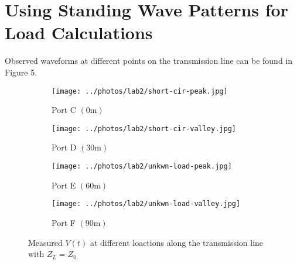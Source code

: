 \documentclass[10pt]{article}
\begin{document}

\section{Using Standing Wave Patterns for Load Calculations}

Observed waveforms at different points on the transmission line can be found in Figure 5.

\begin{figure}[ht]
    \centering
    \begin{subfigure}[b]{0.45\textwidth}
        \texttt{[image: ../photos/lab2/short-cir-peak.jpg]}
        \caption{Port C $(0\text{m})$}
    \end{subfigure}
    \quad
    \begin{subfigure}[b]{0.45\textwidth}
        \texttt{[image: ../photos/lab2/short-cir-valley.jpg]}
        \caption{Port D $(30\text{m})$}
    \end{subfigure}
    \begin{subfigure}[b]{0.45\textwidth}
        \texttt{[image: ../photos/lab2/unkwn-load-peak.jpg]}
        \caption{Port E $(60\text{m})$}
    \end{subfigure}
    \quad
    \begin{subfigure}[b]{0.45\textwidth}
        \texttt{[image: ../photos/lab2/unkwn-load-valley.jpg]}
        \caption{Port F $(90\text{m})$}
    \end{subfigure}
    \caption{Measured $V(t)$ at different loactions along the transmission line with $Z_L = Z_0$ \vspace{-0.5cm}}
    \label{v_t_matched_tline}
\end{figure}


\end{document}
